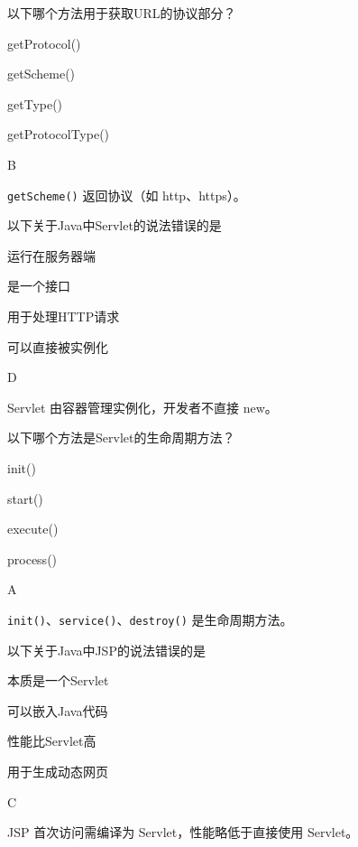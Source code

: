 \begin{question}
	以下哪个方法用于获取URL的协议部分？
	\begin{options}
		\item getProtocol()
		\item getScheme()
		\item getType()
		\item getProtocolType()
	\end{options}
	\begin{answer}
		B
	\end{answer}
	\begin{explanation}
		\texttt{getScheme()} 返回协议（如 http、https）。
	\end{explanation}
\end{question}

\begin{question}
	以下关于Java中Servlet的说法错误的是
	\begin{options}
		\item 运行在服务器端
		\item 是一个接口
		\item 用于处理HTTP请求
		\item 可以直接被实例化
	\end{options}
	\begin{answer}
		D
	\end{answer}
	\begin{explanation}
		Servlet 由容器管理实例化，开发者不直接 new。
	\end{explanation}
\end{question}

\begin{question}
	以下哪个方法是Servlet的生命周期方法？
	\begin{options}
		\item init()
		\item start()
		\item execute()
		\item process()
	\end{options}
	\begin{answer}
		A
	\end{answer}
	\begin{explanation}
		\texttt{init()}、\texttt{service()}、\texttt{destroy()} 是生命周期方法。
	\end{explanation}
\end{question}

\begin{question}
	以下关于Java中JSP的说法错误的是
	\begin{options}
		\item 本质是一个Servlet
		\item 可以嵌入Java代码
		\item 性能比Servlet高
		\item 用于生成动态网页
	\end{options}
	\begin{answer}
		C
	\end{answer}
	\begin{explanation}
		JSP 首次访问需编译为 Servlet，性能略低于直接使用 Servlet。
	\end{explanation}
\end{question}

